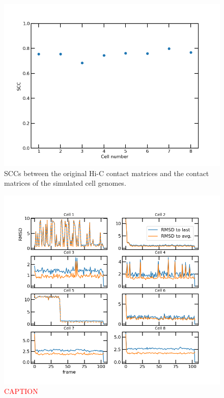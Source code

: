 \documentclass[a4paper,11pt,oneside,final,english,toc=bib,draft]{scrbook}
\newcommand{\figwidth}{12cm} %
\begin{document}
\begin{figure}[ht]
\centering
  \includegraphics[width=\figwidth]{hic_vs_sim_scc.png}
  \caption{SCCs between the original Hi-C contact matrices and the contact matrices of the simulated cell genomes.}
  \label{fig:hic_vs_sim_scc}
\end{figure}

\begin{figure}[ht]
\centering
  \includegraphics[width=\textwidth+0.5cm]{rmsd_last_vs_avg.png}
  \caption{\textcolor{red}{CAPTION}}
  \label{fig:rmsd_last_vs_avg}
\end{figure}
\end{document}
